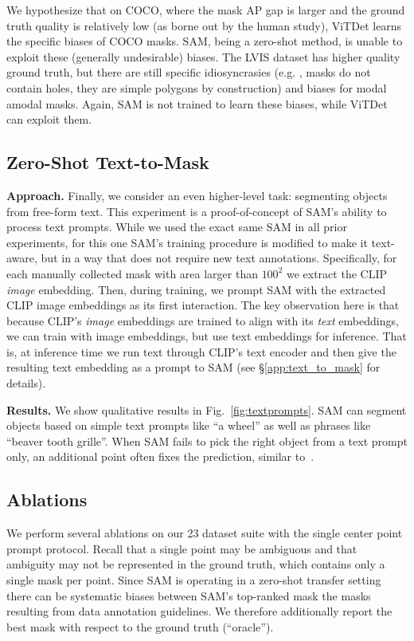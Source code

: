 We hypothesize that on COCO, where the mask AP gap is larger and the ground truth quality is relatively low (as borne out by the human study), ViTDet learns the specific biases of COCO masks. SAM, being a zero-shot method, is unable to exploit these (generally undesirable) biases. The LVIS dataset has higher quality ground truth, but there are still specific idiosyncrasies (e.g. , masks do not contain holes, they are simple polygons by construction) and biases for modal \vs amodal masks. Again, SAM is not trained to learn these biases, while ViTDet can exploit them.

\subsection{Zero-Shot Text-to-Mask}\label{sec:eval:text_to_mask}

\textbf{Approach.} Finally, we consider an even higher-level task: segmenting objects from free-form text. This experiment is a proof-of-concept of SAM's ability to process text prompts. While we used the exact same SAM in all prior experiments, for this one SAM's training procedure is modified to make it text-aware, but in a way that does not require new text annotations. Specifically, for each manually collected mask with area larger than $\textrm{100}^\textrm{2}$ we extract the CLIP \emph{image} embedding. Then, during training, we prompt SAM with the extracted CLIP image embeddings as its first interaction. The key observation here is that because CLIP's \emph{image} embeddings are trained to align with its \emph{text} embeddings, we can train with image embeddings, but use text embeddings for inference. That is, at inference time we run text through CLIP's text encoder and then give the resulting text embedding as a prompt to SAM (see \S\ref{app:text_to_mask} for details).

\textbf{Results.} We show qualitative results in Fig.~\ref{fig:textprompts}. SAM can segment objects based on simple text prompts like ``a wheel'' as well as phrases like ``beaver tooth grille''. When SAM fails to pick the right object from a text prompt only, an additional point often fixes the prediction, similar to~\cite{ding2020phraseclick}.

\subsection{Ablations}\label{sec:eval:ablations}

We perform several ablations on our 23 dataset suite with the single center point prompt protocol. Recall that a single point may be ambiguous and that ambiguity may not be represented in the ground truth, which contains only a single mask per point. Since SAM is operating in a zero-shot transfer setting there can be systematic biases between SAM's top-ranked mask \vs the masks resulting from data annotation guidelines. We therefore additionally report the best mask with respect to the ground truth (``oracle'').

